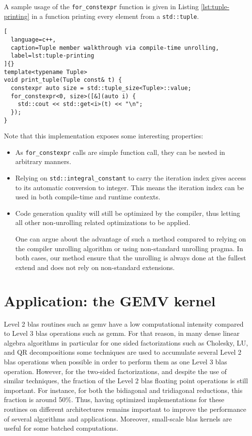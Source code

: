 \documentclass[../main]{subfiles}
\begin{document}
A sample usage of the \lstinline{for_constexpr} function is given
in Listing \ref{lst:tuple-printing} in a function printing
every element from a \lstinline{std::tuple}.

\begin{lstlisting}[
  language=c++,
  caption=Tuple member walkthrough via compile-time unrolling,
  label=lst:tuple-printing
]{}
template<typename Tuple>
void print_tuple(Tuple const& t) {
  constexpr auto size = std::tuple_size<Tuple>::value;
  for_constexpr<0, size>([&](auto i) {
    std::cout << std::get<i>(t) << "\n";
  });
}
\end{lstlisting}

Note that this implementation exposes some interesting
properties:

\begin{itemize}
\item
As \lstinline{for_constexpr} calls are simple function call, they
can be nested in arbitrary manners.

\item
Relying on \lstinline{std::integral_constant} to carry the
iteration index gives access to its automatic conversion
to integer. This means the iteration index can be used in
both compile-time and runtime contexts.

\item
Code generation quality will still be optimized by the
compiler, thus letting all other non-unrolling related optimizations
to be applied.

One can argue about the advantage of such a method
compared to relying on the compiler unrolling algorithm
or using non-standard unrolling pragma. In both cases, our
method ensure that the unrolling is always done at the fullest
extend and does not rely on non-standard extensions.
\end{itemize}

\section{
  Application: the GEMV kernel
}

Level 2 \gls{blas} routines such as gemv have a low
computational intensity compared to Level 3 \gls{blas} operations
such as gemm. For that reason, in many dense linear algebra
algorithms in particular for one sided factorizations such as
Cholesky, LU, and QR decompositions some techniques are
used to accumulate several Level 2 \gls{blas} operations when
possible in order to perform them as one Level 3 \gls{blas}
operation\cite{hpcs18}. However, for the two-sided factorizations,
and despite the use of similar techniques, the fraction of the
Level 2 \gls{blas} floating point operations is still important. For
instance, for both the bidiagonal and tridiagonal reductions,
this fraction is around 50\%\cite{hpcs19}. Thus, having optimized
implementations for these routines on different architectures
remains important to improve the performance of several
algorithms and applications. Moreover, small-scale \gls{blas}
kernels are useful for some batched computations\cite{hpcs20}.
\end{document}
